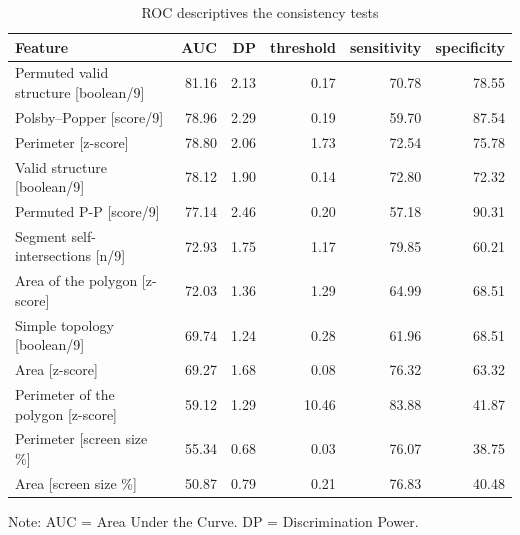 \documentclass[
  man,
  floatsintext,
  longtable,
  a4paper,
  nolmodern,
  notxfonts,
  notimes,
  colorlinks=true,linkcolor=blue,citecolor=blue,urlcolor=blue]{apa7}
\begin{document}
\begin{table}

{\caption{{ROC descriptives the consistency tests}{\label{tbl-03}}}
\vspace{-20pt}}

\fontsize{12.0pt}{14.0pt}\selectfont
\begin{tabular*}{\linewidth}{@{\extracolsep{\fill}}lrrrrr}
\toprule
Feature & AUC & DP & threshold & sensitivity & specificity \\ 
\midrule\addlinespace[2.5pt]
Permuted valid structure [boolean/9] & 81.16 & 2.13 & 0.17 & 70.78 & 78.55 \\ 
Polsby–Popper [score/9] & 78.96 & 2.29 & 0.19 & 59.70 & 87.54 \\ 
Perimeter [z-score] & 78.80 & 2.06 & 1.73 & 72.54 & 75.78 \\ 
Valid structure [boolean/9] & 78.12 & 1.90 & 0.14 & 72.80 & 72.32 \\ 
Permuted P-P [score/9] & 77.14 & 2.46 & 0.20 & 57.18 & 90.31 \\ 
Segment self-intersections [n/9] & 72.93 & 1.75 & 1.17 & 79.85 & 60.21 \\ 
Area of the polygon [z-score] & 72.03 & 1.36 & 1.29 & 64.99 & 68.51 \\ 
Simple topology [boolean/9] & 69.74 & 1.24 & 0.28 & 61.96 & 68.51 \\ 
Area [z-score] & 69.27 & 1.68 & 0.08 & 76.32 & 63.32 \\ 
Perimeter of the polygon [z-score] & 59.12 & 1.29 & 10.46 & 83.88 & 41.87 \\ 
Perimeter [screen size \%] & 55.34 & 0.68 & 0.03 & 76.07 & 38.75 \\ 
Area [screen size \%] & 50.87 & 0.79 & 0.21 & 76.83 & 40.48 \\ 
\bottomrule
\end{tabular*}
\begin{minipage}{\linewidth}
\vspace{.05em}
Note: AUC = Area Under the Curve. DP = Discrimination Power.\\
\end{minipage}

\end{table}
\end{document}
